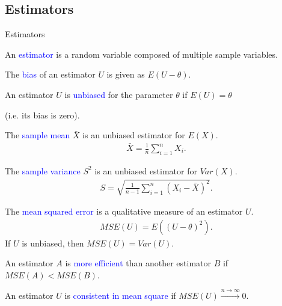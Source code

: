 \documentclass{beamer}
\def\padding{\vspace{0.5cm}}
\def\spadding{\vspace{0.25cm}}
\def\b{\textcolor{blue}}
\begin{document}
\subsection{Estimators}
\begin{frame}{Estimators}
    \begin{definition}
        An \b{estimator} is a random variable composed of multiple sample variables.\pause\par\spadding
        The \b{bias} of an estimator $U$ is given as $E(U - \theta)$.\pause\par\spadding
        An estimator $U$ is \b{unbiased} for the parameter $\theta$ if $E(U) = \theta$\par
        (i.e. its bias is zero).
    \end{definition}
\end{frame}

\begin{frame}
    \begin{definition}
        The \b{sample mean} $\bar{X}$ is an unbiased estimator for $E(X)$.
        \begin{align*}
            \bar{X} = \frac{1}{n} \sum_{i=1}^n X_i.
        \end{align*}
    \end{definition}\pause\par\padding
    \begin{definition}
        The \b{sample variance} $S^2$ is an unbiased estimator for $Var(X)$.
        \begin{align*}
            S = \sqrt{\frac{1}{n - 1} \sum_{i=1}^n (X_i - \bar{X})^2}.
        \end{align*}
    \end{definition}
\end{frame}

\begin{frame}
    \begin{definition}
        The \b{mean squared error} is a qualitative measure of an estimator $U$.
        \begin{align*}
            MSE(U) = E((U - \theta)^2).
        \end{align*}\pause
        If $U$ is unbiased, then $MSE(U) = Var(U)$.\pause\par\spadding
        An estimator $A$ is \b{more efficient} than another estimator $B$ if $MSE(A) < MSE(B)$.\par\pause\spadding
        An estimator $U$ is \b{consistent in mean square} if $MSE(U) \xrightarrow{n \to \infty} 0.$
    \end{definition}
\end{frame}
\end{document}
